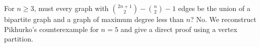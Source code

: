 For $n\ge3$, must every graph with
$\binom{2n+1}{2}-\binom n2-1$ edges be the union of a bipartite graph and a graph of maximum degree less than $n$? No. We reconstruct Pikhurko's counterexample for $n=5$ and give a direct proof using a vertex partition.
